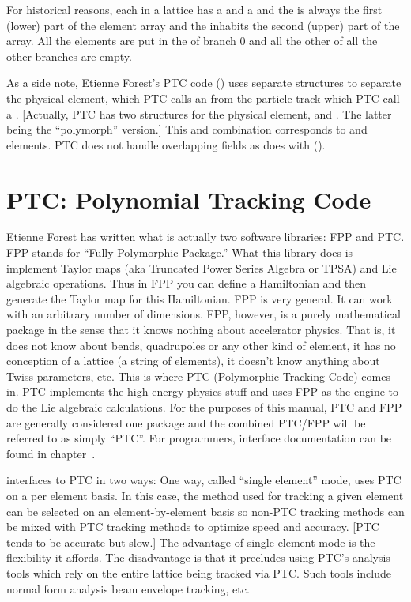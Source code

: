 For historical reasons, each  in a lattice has a
 and a  and the  is always the first (lower) part of the element array and the
 inhabits the second (upper) part of the array.  All
the  elements are put in the  of branch 0
and all the other  of all the other branches are
empty.

As a side note, Etienne Forest's PTC code () uses separate
structures to separate the physical element, which PTC calls an
 from the particle track which PTC call a .
[Actually, PTC has two structures for the physical element,
 and . The latter being the ``polymorph''
version.] This  and  combination corresponds to
\bmad {} and  elements. PTC does
not handle overlapping fields as \bmad does with 
().

\section{PTC: Polynomial Tracking Code}
\label{s:ptc.intro}

Etienne Forest\cite{b:forest} has written what is actually two
software libraries: FPP and PTC.  FPP stands for ``Fully Polymorphic
Package.'' What this library does is implement Taylor maps (aka
Truncated Power Series Algebra or TPSA) and Lie algebraic
operations. Thus in FPP you can define a Hamiltonian and then generate
the Taylor map for this Hamiltonian. FPP is very general. It can work
with an arbitrary number of dimensions.  FPP, however, is a purely
mathematical package in the sense that it knows nothing about
accelerator physics. That is, it does not know about bends,
quadrupoles or any other kind of element, it has no conception of a
lattice (a string of elements), it doesn't know anything about Twiss
parameters, etc. This is where PTC (Polymorphic Tracking Code) comes
in. PTC implements the high energy physics stuff and uses FPP as
the engine to do the Lie algebraic calculations.  For the purposes of
this manual, PTC and FPP are generally considered one package and the
combined PTC/FPP will be referred to as simply ``PTC''.
For programmers, interface documentation can be found in
chapter~.

\bmad interfaces to PTC in two ways: One way, called ``single
element'' mode, uses PTC on a per element basis. In this case, the
method used for tracking a given element can be selected on an
element-by-element basis so non-PTC tracking methods can be mixed with
PTC tracking methods to optimize speed and accuracy. [PTC tends to be
accurate but slow.] The advantage of single element mode is the
flexibility it affords. The disadvantage is that it precludes using
PTC's analysis tools which rely on the entire lattice being tracked
via PTC. Such tools include normal form analysis beam envelope
tracking, etc.

